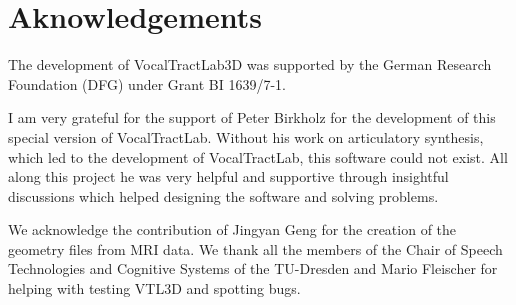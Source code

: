 \documentclass[]{article}
\begin{document}
	\section{Aknowledgements}
	
	The development of VocalTractLab3D was supported by the German Research Foundation (DFG) under Grant BI 1639/7-1.
	
	I am very grateful for the support of Peter Birkholz for the development of this special
	version of VocalTractLab. Without his work on articulatory synthesis, which led to the 
	development of VocalTractLab, this software could not exist. 
	All along this project he was very 
	helpful and supportive through insightful discussions which helped designing the software
	and solving problems.
	
	We acknowledge the contribution of Jingyan Geng for the creation of the geometry files 
	from MRI data.
	We thank all the members of the Chair of Speech Technologies and Cognitive Systems of the TU-Dresden and Mario Fleischer for helping with testing VTL3D 
	and spotting bugs.
	
	\printbibliography
\end{document}
